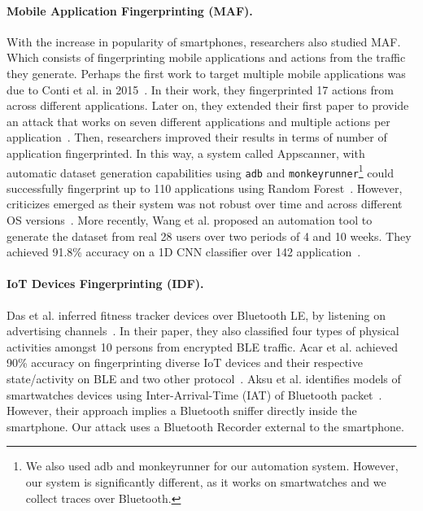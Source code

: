 \paragraph{Mobile Application Fingerprinting (MAF).} With the increase in popularity of smartphones, researchers also studied MAF.  Which consists of fingerprinting mobile applications and actions from the traffic they generate. Perhaps the first work to target multiple mobile applications was due to Conti et al. in 2015~\cite{conti2015can}. In their work, they fingerprinted 17 actions from across different applications. Later on, they extended their first paper to provide an attack that works on seven different applications and multiple actions per application~\cite{conti2015analyzing}. Then, researchers improved their results in terms of number of application fingerprinted. In this way, a system called Appscanner, with automatic dataset generation capabilities using \texttt{adb} and \texttt{monkeyrunner}\footnote{We also used adb and monkeyrunner for our automation system. However, our system is significantly different, as it works on smartwatches and we collect traces over Bluetooth.} could successfully fingerprint up to 110 applications using Random Forest~\cite{taylor2016appscanner}. However, criticizes emerged as their system was not robust over time and across different OS versions~\cite{taylor2017robust}. More recently, Wang et al. proposed an automation tool to generate the dataset from real 28 users over two periods of 4 and 10 weeks. They achieved 91.8\% accuracy on a 1D CNN classifier over 142 application~\cite{wang2020real}.

\newpage


\paragraph{IoT Devices Fingerprinting (IDF).} Das et al. inferred fitness tracker devices over Bluetooth LE, by listening on advertising channels~\cite{das2016uncovering}. In their paper, they also classified four types of physical activities amongst 10 persons from encrypted BLE traffic. Acar et al. achieved 90\% accuracy on fingerprinting diverse IoT devices and their respective state/activity on BLE and two other protocol~\cite{acar2018peek}. Aksu et al. identifies models of smartwatches devices using Inter-Arrival-Time (IAT) of Bluetooth packet~\cite{fingerprintWearableDevices}. However, their approach implies a Bluetooth sniffer directly inside the smartphone. Our attack uses a Bluetooth Recorder external to the smartphone.  





